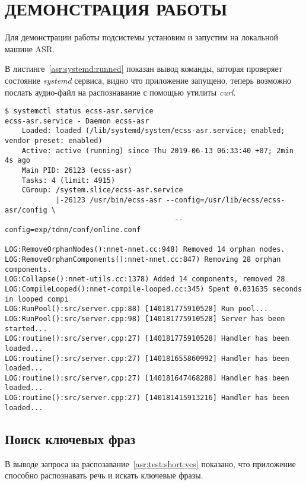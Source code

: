 \chapter{ДЕМОНСТРАЦИЯ РАБОТЫ}

Для демонстрации работы подсистемы установим и запустим на локальной машине ASR.

В листинге~\ref{asr:systemd:runned} показан вывод команды, которая проверяет
состояние \textit{systemd} сервиса, видно что приложение запущено, теперь возможно
послать аудио-файл на распознавание с помощью утилиты \textit{curl}.

\begin{lstlisting}[caption={Проверка systemd сервиса},label=asr:systemd:runned]
$ systemctl status ecss-asr.service
ecss-asr.service - Daemon ecss-asr
    Loaded: loaded (/lib/systemd/system/ecss-asr.service; enabled; vendor preset: enabled)
    Active: active (running) since Thu 2019-06-13 06:33:40 +07; 2min 4s ago
    Main PID: 26123 (ecss-asr)
    Tasks: 4 (limit: 4915)
    CGroup: /system.slice/ecss-asr.service
            |-26123 /usr/bin/ecss-asr --config=/usr/lib/ecss/ecss-asr/config \
                                        --config=exp/tdnn/conf/online.conf

LOG:RemoveOrphanNodes():nnet-nnet.cc:948) Removed 14 orphan nodes.
LOG:RemoveOrphanComponents():nnet-nnet.cc:847) Removing 28 orphan components.
LOG:Collapse():nnet-utils.cc:1378) Added 14 components, removed 28
LOG:CompileLooped():nnet-compile-looped.cc:345) Spent 0.031635 seconds in looped compi
LOG:RunPool():src/server.cpp:88) [140181775910528] Run pool...
LOG:RunPool():src/server.cpp:98) [140181775910528] Server has been started...
LOG:routine():src/server.cpp:27) [140181775910528] Handler has been loaded...
LOG:routine():src/server.cpp:27) [140181655860992] Handler has been loaded...
LOG:routine():src/server.cpp:27) [140181647468288] Handler has been loaded...
LOG:routine():src/server.cpp:27) [140181415913216] Handler has been loaded...

\end{lstlisting}

\section{Поиск ключевых фраз}

В выводе запроса на распозавание~\ref{asr:test:short:yes} показано, что приложение
способно распознавать речь и искать ключевые фразы.

